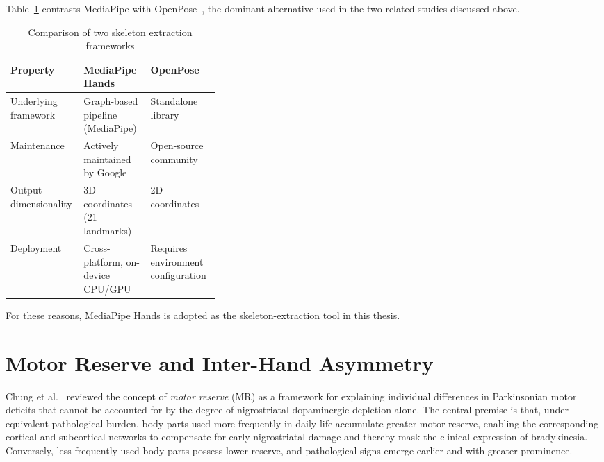 Table~\ref{tab:skeleton_comparison} contrasts MediaPipe with OpenPose~\cite{shi2019skeleton}, the dominant alternative used in the two related studies discussed above.

\begin{table}[H]
    \centering
    \caption{Comparison of two skeleton extraction frameworks}
    \label{tab:skeleton_comparison}
    \small
    \setlength{\tabcolsep}{8pt}
    \begin{tabularx}{\linewidth}{>{\raggedright\arraybackslash}p{0.35\linewidth} >{\raggedright\arraybackslash}X >{\raggedright\arraybackslash}X}
        \hline
        Property & MediaPipe Hands & OpenPose \\
        \hline
        Underlying framework     & Graph-based pipeline (MediaPipe)      & Standalone library \\
        Maintenance   & Actively maintained by Google         & Open-source community \\
        Output dimensionality    & 3D coordinates (21 landmarks)         & 2D coordinates \\
        Deployment               & Cross-platform, on-device CPU/GPU     & Requires environment configuration \\
        \hline
    \end{tabularx}
\end{table}

For these reasons, MediaPipe Hands is adopted as the skeleton-extraction tool in this thesis.

\section{Motor Reserve and Inter-Hand Asymmetry}
\label{sec:rw_motor_reserve}

Chung et al.~\cite{chung2020motor} reviewed the concept of \emph{motor reserve} (MR) as a framework for explaining individual differences in Parkinsonian motor deficits that cannot be accounted for by the degree of nigrostriatal dopaminergic depletion alone. The central premise is that, under equivalent pathological burden, body parts used more frequently in daily life accumulate greater motor reserve, enabling the corresponding cortical and subcortical networks to compensate for early nigrostriatal damage and thereby mask the clinical expression of bradykinesia. Conversely, less-frequently used body parts possess lower reserve, and pathological signs emerge earlier and with greater prominence.

